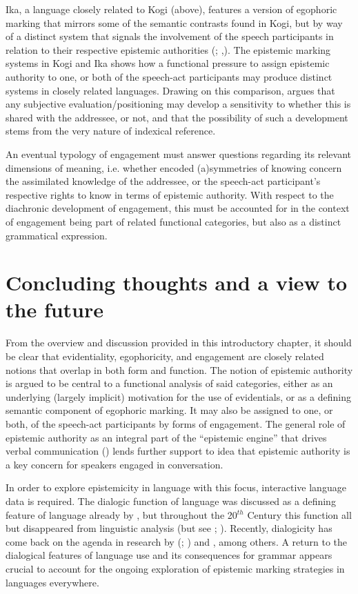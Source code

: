 \documentclass[output=paper]{langsci/langscibook}
\begin{document}
Ika, a language closely related to Kogi (above), features a version of egophoric marking that mirrors some of the semantic contrasts found in Kogi, but by way of a distinct system that signals the involvement of the speech participants in relation to their respective epistemic authorities (\citealt{Bergqvist2012}; \citeyear{Bergqvist2018a},\citeyear{Bergqvist2018b}). The epistemic marking systems in Kogi and Ika shows how a functional pressure to assign epistemic authority to one, or both of the speech-act participants may produce distinct systems in closely related languages. Drawing on this comparison, \cite{Bergqvist2018b} argues that any subjective evaluation/positioning may develop a sensitivity to whether this is shared with the addressee, or not, and that the possibility of such a development stems from the very nature of indexical reference.

An eventual typology of engagement must answer questions regarding its relevant dimensions of meaning, i.e. whether encoded (a)symmetries of knowing concern the assimilated knowledge of the addressee, or the speech-act participant’s respective rights to know in terms of epistemic authority. With respect to the diachronic development of engagement, this must be accounted for in the context of engagement being part of related functional categories, but also as a distinct grammatical expression.
%
\section{Concluding thoughts and a view to the future}\label{s:hb4}

From the overview and discussion provided in this introductory chapter, it should be clear that evidentiality, egophoricity, and engagement are closely related notions that overlap in both form and function. The notion of epistemic authority is argued to be central to a functional analysis of said categories, either as an underlying (largely implicit) motivation for the use of evidentials, or as a defining semantic component of egophoric marking. It may also be assigned to one, or both, of the speech-act participants by forms of engagement. The general role of epistemic authority as an integral part of the “epistemic engine” that drives verbal communication (\citealt{Heritage2012}) lends further support to idea that epistemic authority is a key concern for speakers engaged in conversation.

In order to explore epistemicity in language with this focus, interactive language data is required. The dialogic function of language was discussed as a defining feature of language already by \cite{Jespersen1922}, but throughout the 20$^{th}$ Century this function all but disappeared from linguistic analysis (but see \citealt{Givon2001}; \citealt{Halliday1973}). Recently, dialogicity has come back on the agenda in research by \citeauthor{DuBois2007} (\citeyear{DuBois2007}; \citeyear{DuBois2014}) and \cite{Evans2012}, among others. A return to the dialogical features of language use and its consequences for grammar appears crucial to account for the ongoing exploration of epistemic marking strategies in languages everywhere.
\end{document}
